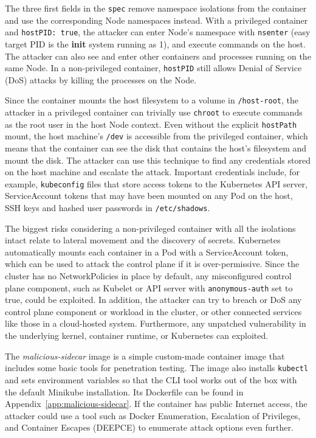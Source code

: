 \documentclass[english, 12pt, a4paper, sci, utf8, a-2b, online]{aaltothesis}
\begin{document}


The three first fields in the \lstinline{spec} remove namespace isolations from the container and use the corresponding Node namespaces instead.
With a privileged container and \lstinline{hostPID: true}, the attacker can enter Node's namespace with \lstinline{nsenter} (easy target PID is the \textbf{init} system running as 1), and execute commands on the host.
The attacker can also see and enter other containers and processes running on the same Node.
In a non-privileged container, \lstinline{hostPID} still allows Denial of Service (DoS) attacks by killing the processes on the Node.

Since the container mounts the host filesystem to a volume in \lstinline{/host-root}, the attacker in a privileged container can trivially use \lstinline{chroot} to execute commands as the root user in the host Node context.
Even without the explicit \lstinline{hostPath} mount, the host machine's \lstinline{/dev} is accessible from the privileged container, which means that the container can see the disk that contains the host's filesystem and mount the disk.
The attacker can use this technique to find any credentials stored on the host machine and escalate the attack.
Important credentials include, for example, \lstinline{kubeconfig} files that store access tokens to the Kubernetes API server, ServiceAccount tokens that may have been mounted on any Pod on the host, SSH keys and hashed user passwords in \lstinline{/etc/shadows}.

The biggest risks considering a non-privileged container with all the isolations intact relate to lateral movement and the discovery of secrets.
Kubernetes automatically mounts each container in a Pod with a ServiceAccount token, which can be used to attack the control plane if it is over-permissive.
Since the cluster has no NetworkPolicies in place by default, any misconfigured control plane component, such as Kubelet or API server with \lstinline{anonymous-auth} set to true, could be exploited.
In addition, the attacker can try to breach or DoS any control plane component or workload in the cluster, or other connected services like those in a cloud-hosted system.
Furthermore, any unpatched vulnerability in the underlying kernel, container runtime, or Kubernetes can exploited.

The \emph{malicious-sidecar} image is a simple custom-made container image that includes some basic tools for penetration testing.
The image also installs \lstinline{kubectl} and sets environment variables so that the CLI tool works out of the box with the default Minikube installation.
Its Dockerfile can be found in Appendix~\ref{app:malicious-sidecar}.
If the container has public Internet access, the attacker could use a tool such as Docker Enumeration, Escalation of Privileges, and Container Escapes (DEEPCE) \cite{deepce} to enumerate attack options even further.
\end{document}
